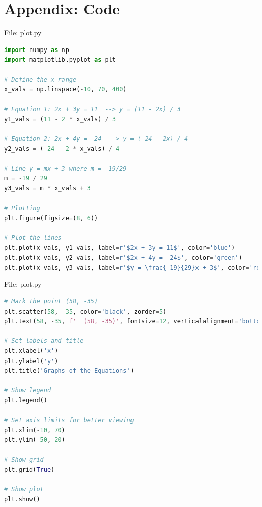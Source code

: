 \documentclass{beamer}
\numberwithin{equation}{section}
\theoremstyle{remark}
\begin{document}
\section*{Appendix: Code}
\begin{frame}[fragile]{File: plot.py}
\begin{lstlisting}[language=Python]
import numpy as np
import matplotlib.pyplot as plt

# Define the x range
x_vals = np.linspace(-10, 70, 400)

# Equation 1: 2x + 3y = 11  --> y = (11 - 2x) / 3
y1_vals = (11 - 2 * x_vals) / 3

# Equation 2: 2x + 4y = -24  --> y = (-24 - 2x) / 4
y2_vals = (-24 - 2 * x_vals) / 4

# Line y = mx + 3 where m = -19/29
m = -19 / 29
y3_vals = m * x_vals + 3

# Plotting
plt.figure(figsize=(8, 6))

# Plot the lines
plt.plot(x_vals, y1_vals, label=r'$2x + 3y = 11$', color='blue')
plt.plot(x_vals, y2_vals, label=r'$2x + 4y = -24$', color='green')
plt.plot(x_vals, y3_vals, label=r'$y = \frac{-19}{29}x + 3$', color='red', linestyle='dashed')
\end{lstlisting}
\end{frame}

\begin{frame}[fragile]{File: plot.py}
\begin{lstlisting}[language=Python]
# Mark the point (58, -35)
plt.scatter(58, -35, color='black', zorder=5)
plt.text(58, -35, f'  (58, -35)', fontsize=12, verticalalignment='bottom')

# Set labels and title
plt.xlabel('x')
plt.ylabel('y')
plt.title('Graphs of the Equations')

# Show legend
plt.legend()

# Set axis limits for better viewing
plt.xlim(-10, 70)
plt.ylim(-50, 20)

# Show grid
plt.grid(True)

# Show plot
plt.show()
\end{lstlisting}
\end{frame}
\end{document}
